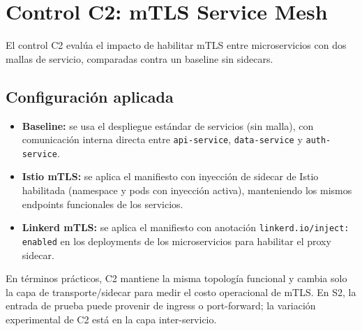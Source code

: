 
\section{Control C2: mTLS Service Mesh}
\label{sec:c2-mtls-service-mesh}

El control C2 eval\'ua el impacto de habilitar mTLS entre microservicios con dos mallas de servicio, comparadas contra un baseline sin sidecars.

\subsection{Configuraci\'on aplicada}

\begin{itemize}
  \item \textbf{Baseline:} se usa el despliegue est\'andar de servicios (sin malla), con comunicaci\'on interna directa entre \texttt{api-service}, \texttt{data-service} y \texttt{auth-service}.

  \item \textbf{Istio mTLS:} se aplica el manifiesto con inyecci\'on de sidecar de Istio habilitada (namespace y pods con inyecci\'on activa), manteniendo los mismos endpoints funcionales de los servicios.

  \item \textbf{Linkerd mTLS:} se aplica el manifiesto con anotaci\'on \texttt{linkerd.io/inject: enabled} en los deployments de los microservicios para habilitar el proxy sidecar.
\end{itemize}

En t\'erminos pr\'acticos, C2 mantiene la misma topolog\'ia funcional y cambia solo la capa de transporte/sidecar para medir el costo operacional de mTLS. En S2, la entrada de prueba puede provenir de ingress o port-forward; la variaci\'on experimental de C2 est\'a en la capa inter-servicio.
